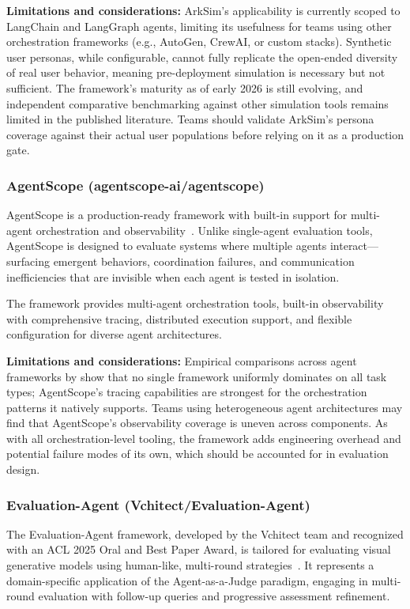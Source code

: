 \textbf{Limitations and considerations:} ArkSim's applicability is currently scoped to LangChain and LangGraph agents, limiting its usefulness for teams using other orchestration frameworks (e.g., AutoGen, CrewAI, or custom stacks). Synthetic user personas, while configurable, cannot fully replicate the open-ended diversity of real user behavior, meaning pre-deployment simulation is necessary but not sufficient. The framework's maturity as of early 2026 is still evolving, and independent comparative benchmarking against other simulation tools remains limited in the published literature. Teams should validate ArkSim's persona coverage against their actual user populations before relying on it as a production gate.

\subsubsection{AgentScope (agentscope-ai/agentscope)}

AgentScope is a production-ready framework with built-in support for multi-agent orchestration and observability~\citep{comprehensive_empirical}. Unlike single-agent evaluation tools, AgentScope is designed to evaluate systems where multiple agents interact---surfacing emergent behaviors, coordination failures, and communication inefficiencies that are invisible when each agent is tested in isolation.

The framework provides multi-agent orchestration tools, built-in observability with comprehensive tracing, distributed execution support, and flexible configuration for diverse agent architectures.

\textbf{Limitations and considerations:} Empirical comparisons across agent frameworks by \citet{comprehensive_empirical} show that no single framework uniformly dominates on all task types; AgentScope's tracing capabilities are strongest for the orchestration patterns it natively supports. Teams using heterogeneous agent architectures may find that AgentScope's observability coverage is uneven across components. As with all orchestration-level tooling, the framework adds engineering overhead and potential failure modes of its own, which should be accounted for in evaluation design.

\subsubsection{Evaluation-Agent (Vchitect/Evaluation-Agent)}

The Evaluation-Agent framework, developed by the Vchitect team and recognized with an ACL 2025 Oral and Best Paper Award, is tailored for evaluating visual generative models using human-like, multi-round strategies~\citep{evaluation_agent_primary}. It represents a domain-specific application of the Agent-as-a-Judge paradigm, engaging in multi-round evaluation with follow-up queries and progressive assessment refinement.

